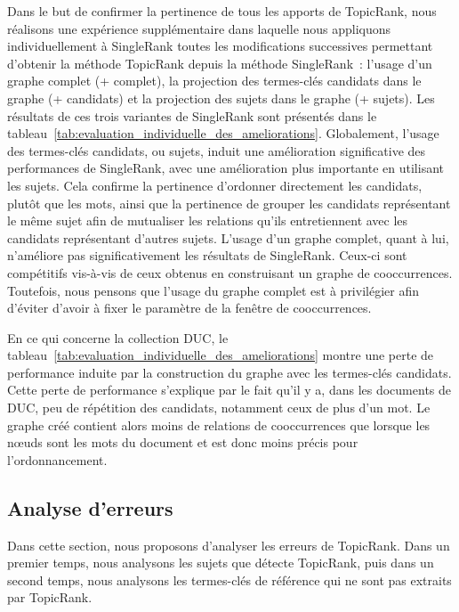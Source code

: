         Dans le but de confirmer la pertinence de tous les apports de TopicRank,
        nous réalisons une expérience supplémentaire dans laquelle nous
        appliquons individuellement à SingleRank toutes les modifications
        successives permettant d'obtenir la méthode TopicRank depuis la méthode
        SingleRank~: l'usage d'un graphe complet (+ complet), la projection des
        termes-clés candidats dans le graphe (+ candidats) et la projection des
        sujets dans le graphe (+ sujets). Les résultats de ces trois variantes
        de SingleRank sont présentés dans le
        tableau~\ref{tab:evaluation_individuelle_des_ameliorations}.
        Globalement, l'usage des termes-clés candidats, ou sujets, induit une
        amélioration significative des performances de SingleRank, avec une
        amélioration plus importante en utilisant les sujets. Cela confirme la
        pertinence d'ordonner directement les candidats, plutôt que les mots,
        ainsi que la pertinence de grouper les candidats représentant le même
        sujet afin de mutualiser les relations qu'ils entretiennent avec les
        candidats représentant d'autres sujets. L'usage d'un graphe complet,
        quant à lui, n'améliore pas significativement les résultats de
        SingleRank. Ceux-ci sont compétitifs vis-à-vis de ceux obtenus en
        construisant un graphe de cooccurrences. Toutefois, nous pensons que
        l'usage du graphe complet est à privilégier afin d'éviter d'avoir à
        fixer le paramètre de la fenêtre de cooccurrences.
        
        En ce qui concerne la collection DUC, le
        tableau~\ref{tab:evaluation_individuelle_des_ameliorations} montre une
        perte de performance induite par la construction du graphe avec les
        termes-clés candidats. Cette perte de performance s'explique par le fait
        qu'il y a, dans les documents de DUC, peu de répétition des candidats,
        notamment ceux de plus d'un mot. Le graphe créé contient alors moins de
        relations de cooccurrences que lorsque les n\oe{}uds sont les mots du
        document et est donc moins précis pour l'ordonnancement.

      \subsection{Analyse d'erreurs}
      \label{subsec:main-automatic_keyphrase_annotation-unsupervised_automatic_keyphrase_extraction-error_analysis-}
        Dans cette section, nous proposons d'analyser les erreurs de TopicRank.
        Dans un premier temps, nous analysons les sujets que détecte TopicRank,
        puis dans un second temps, nous analysons les termes-clés de référence
        qui ne sont pas extraits par Topic\-Rank.

